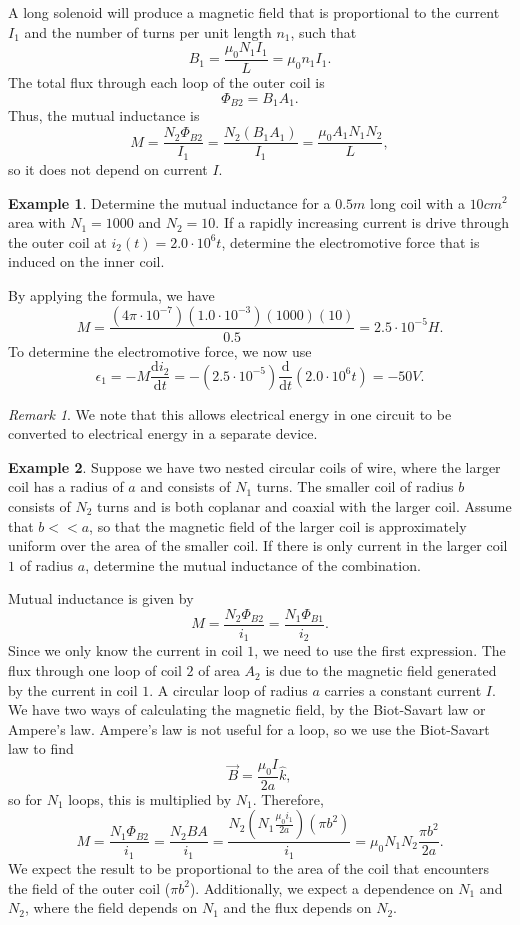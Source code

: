 \documentclass[11pt]{article}
\theoremstyle{plain} %
\theoremstyle{definition}
\theoremstyle{example}
\newtheorem*{example}{Example}
\theoremstyle{remark}
\newtheorem*{remark}{Remark}
\begin{document}
A long solenoid will produce a magnetic field that is proportional to the current $I_1$ and the number of turns per unit length $n_1$, such that 
$$B_1 = \frac{\mu_0N_1I_1}{L} = \mu_0n_1I_1.$$
The total flux through each loop of the outer coil is 
$$\Phi_{B2} = B_1A_1.$$
Thus, the mutual inductance is 
$$M = \frac{N_2\Phi_{B2}}{I_1} = \frac{N_2(B_1A_1)}{I_1} = \frac{\mu_0A_1N_1N_2}{L},$$
so it does not depend on current $I$.  
\begin{example}
Determine the mutual inductance for a $0.5m$ long coil with a $10cm^2$ area with $N_1=1000$ and $N_2=10$. If a rapidly increasing current is drive through the outer coil at $i_2(t) = 2.0\cdot10^6t$, determine the electromotive force that is induced on the inner coil.
\end{example}
By applying the formula, we have 
$$M=\frac{\left(4\pi\cdot 10^{-7}\right)\left(1.0\cdot10^{-3}\right)(1000)(10)}{0.5} = 2.5\cdot 10^{-5}H.$$ To determine the electromotive force, we now use 
$$\epsilon_1 = -M\frac{\mathrm d i_2}{\mathrm d t} = -\left(2.5\cdot10^{-5}\right)\frac{\mathrm d}{\mathrm d t}\left(2.0\cdot10^6t\right) = -50V.$$

\begin{remark}
We note that this allows electrical energy in one circuit to be converted to electrical energy in a separate device. 
\end{remark}
\begin{example}
Suppose we have two nested circular coils of wire, where the larger coil has a radius of $a$ and consists of $N_1$ turns. The smaller coil of radius $b$ consists of $N_2$ turns and is both coplanar and coaxial with the larger coil. Assume that $b<<a$, so that the magnetic field of the larger coil is approximately uniform over the area of the smaller coil. If there is only current in the larger coil $1$ of radius $a$, determine the mutual inductance of the combination. 
\end{example}
Mutual inductance is given by 
$$M = \frac{N_2\Phi_{B2}}{i_1 }= \frac{N_1\Phi_{B1}}{i_2 }.$$
Since we only know the current in coil $1$, we need to use the first expression. The flux through one loop of coil $2$ of area $A_2$ is due to the magnetic field generated by the current in coil $1$. A circular loop of radius $a$ carries a constant current $I$. We have two ways of calculating the magnetic field, by the Biot-Savart law or Ampere's law. Ampere's law is not useful for a loop, so we use the Biot-Savart law to find 
$$\vec{B}=\frac{\mu_0I}{2a}\hat{k},$$
so for $N_1$ loops, this is multiplied by $N_1$. Therefore, 
$$M = \frac{N_1\Phi_{B2}}{i_1} = \frac{N_2BA}{i_1} = \frac{N_2\left(N_1\frac{\mu_0i_1}{2a}\right)\left(\pi b^2\right)}{i_1} = \mu_0N_1N_2\frac{\pi b^2}{2a}.$$
We expect the result to be proportional to the area of the coil that encounters the field of the outer coil ($\pi b^2$). Additionally, we expect a dependence on $N_1$ and $N_2$, where the field depends on $N_1$ and the flux depends on $N_2$. 
\end{document}

